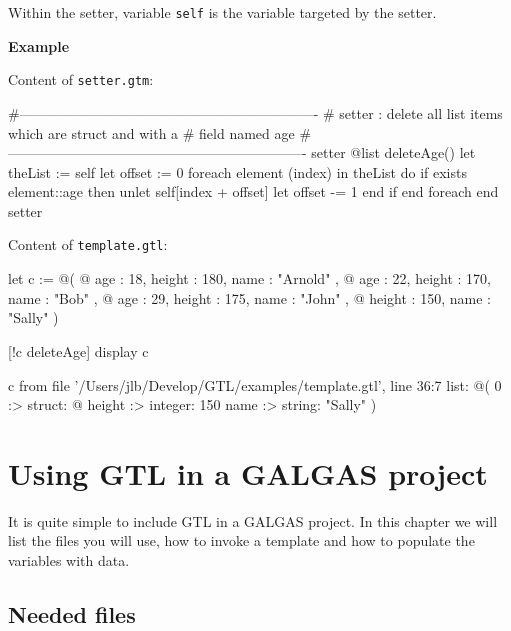 \documentclass[10pt,openright,twosides,final]{memoir}
\newcommand{\gtlinline}[1]{\colorbox{light-blue}{\lstinline[language=gtl]{#1}}}
\newcommand{\example}{\vspace{.75em}\noindent\textbf{Example}\vspace{0em}}
\begin{document}
Within the setter, variable \gtlinline{self} is the variable targeted by the setter.

\example

\noindent Content of \texttt{\footnotesize setter.gtm}:
\begin{gtl}
#----------------------------------------------------------------
# setter : delete all list items which are struct and with a
# field named age
#----------------------------------------------------------------
setter @list deleteAge()
  let theList := self
  let offset := 0
  foreach element (index) in theList do
    if exists element::age then
      unlet self[index + offset]
      let offset -= 1
    end if
  end foreach
end setter
\end{gtl}

\noindent Content of \texttt{\footnotesize template.gtl}:
\begin{gtl}
let c := @(
  @{ age : 18, height : 180, name : "Arnold" },
  @{ age : 22, height : 170, name : "Bob"    },
  @{ age : 29, height : 175, name : "John"   },
  @{           height : 150, name : "Sally"  }
)

[!c deleteAge]
display c
\end{gtl}
\begin{console}
c from file '/Users/jlb/Develop/GTL/examples/template.gtl', line 36:7
    list: @(
        0 :>
            struct: @{
                height :>
                    integer: 150
                name :>
                    string: "Sally"
            }
    )
\end{console}

\chapter{Using GTL in a GALGAS project}

It is quite simple to include GTL in a GALGAS project. In this chapter we will list the files you will use, how to invoke a template and how to populate the variables with data.

\section{Needed files}
\end{document}
